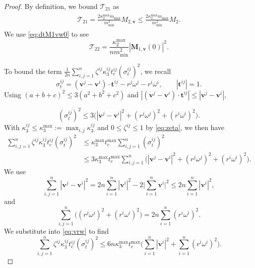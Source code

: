 \documentclass[a4paper,11pt]{article}
\numberwithin{equation}{section}
\theoremstyle{definition}
\newcommand{\bfv}{\boldsymbol{v}}
\newcommand{\bft}{\boldsymbol{t}}
\newcommand{\bfM}{\boldsymbol{M}}
\newcommand{\T}{\mathcal{T}}
\begin{document}
\begin{proof}
By definition, we bound $\T_{21}$ as
\begin{align}
\begin{aligned} \label{eq:T21-inq}
\T_{21} = \frac{2\kappa^{\max}_2 m_{\max}}{ m^2_{\min}} M_{2,\bfv} \leq \frac{2\kappa^{\max}_2 m_{\max}}{ m^2_{\min}} M_{2}.
\end{aligned}
\end{align}
%
We use \eqref{eq:dtM1vw0} to see
\begin{equation} \label{eq:T22-inq}
 \T_{22} = \frac{\kappa^{\max}_2}{n m^2_{\min}}  | \bfM_{1,\bfv}(0)|^2.
\end{equation}


\noindent
To bound the term $\frac{1}{2n}  \sum_{i, j=1}^n  \zeta^{ij} \kappa^{ij}_3 t_c^{ij} (\sigma^{ij}_t)^2$,  
we recall
\[
\sigma^{ij}_t
=
(\bfv^j-\bfv^i)\cdot\bft^{ij}-r^j\omega^j-r^i\omega^i,
\qquad |\bft^{ij}|=1.
\]
Using $(a+b+c)^2\le 3(a^2+b^2+c^2)$ and $|(\bfv^j-\bfv^i)\cdot\bft^{ij}|\le|\bfv^j-\bfv^i|$,

\begin{equation*}%
(\sigma_t^{ij})^2
\le
3\Big(|\bfv^j-\bfv^i|^2 + (r^j\omega^j)^2 + (r^i\omega^i)^2\Big).
\end{equation*}
%
With $\kappa_3^{ij}\le \kappa_3^{\max} := \max_{i,j}\kappa_3^{ij}$ and $0\le \zeta^{ij}\le 1$ by \eqref{eq:zeta}, we then have
%
\begin{align}
\sum_{i,j=1}^n  \zeta^{ij} \kappa^{ij}_3  t_c^{ij} (\sigma^{ij}_t)^2
&\le
\kappa_3^{\max} t_c^{\max}\sum_{i,j=1}^n (\sigma^{ij}_t)^2 \nonumber\\
&\le
3\kappa_3^{\max} t_c^{\max}
\sum_{i,j=1}^n\Big(|\bfv^j-\bfv^i|^2 + (r^j\omega^j)^2 + (r^i\omega^i)^2\Big).
\label{eq:vrw}
\end{align}
We use
\[
\sum_{i,j=1}^n |\bfv^j-\bfv^i|^2
=
2n\sum_{i=1}^n|\bfv^i|^2
-2\Big|\sum_{i=1}^n \bfv^i\Big|^2
\le
2n\sum_{i=1}^n|\bfv^i|^2,
\]
and
\[
\sum_{i,j=1}^n\Big((r^j\omega^j)^2+(r^i\omega^i)^2\Big)
=
2n\sum_{i=1}^n (r^i\omega^i)^2.
\]
%
We substitute into \eqref{eq:vrw} to find
\begin{equation}\label{eq:dsum}
\sum_{i,j=1}^n  \zeta^{ij} \kappa^{ij}_3  t_c^{ij} (\sigma^{ij}_t)^2
\le
6n \kappa_3^{\max} t_c^{\max}
\Big(
\sum_{i=1}^n |\bfv^i|^2
+
\sum_{i=1}^n (r^i\omega^i)^2
\Big).
\end{equation}



\end{proof}
\end{document}
